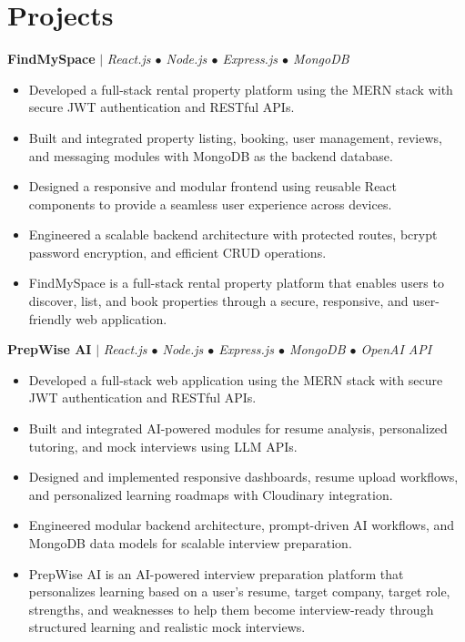 \documentclass[10pt,a4paper]{article}
\begin{document}
\section*{Projects}

\textbf{FindMySpace} \enspace $|$ \enspace
\textit{\small React.js \enspace $\bullet$ \enspace Node.js \enspace $\bullet$ \enspace Express.js \enspace $\bullet$ \enspace MongoDB}
\begin{itemize}[label=$\circ$]
    \item Developed a full-stack rental property platform using the MERN stack with secure JWT authentication and RESTful APIs.
    \item Built and integrated property listing, booking, user management, reviews, and messaging modules with MongoDB as the backend database.
    \item Designed a responsive and modular frontend using reusable React components to provide a seamless user experience across devices.
    \item Engineered a scalable backend architecture with protected routes, bcrypt password encryption, and efficient CRUD operations.
    \item FindMySpace is a full-stack rental property platform that enables users to discover, list, and book properties through a secure, responsive, and user-friendly web application.
\end{itemize}

\vspace{7pt}

\textbf{PrepWise AI} \enspace $|$ \enspace
\textit{\small React.js \enspace $\bullet$ \enspace Node.js \enspace $\bullet$ \enspace Express.js \enspace $\bullet$ \enspace MongoDB \enspace $\bullet$ \enspace OpenAI API}
\begin{itemize}[label=$\circ$]
    \item Developed a full-stack web application using the MERN stack with secure JWT authentication and RESTful APIs.
    \item Built and integrated AI-powered modules for resume analysis, personalized tutoring, and mock interviews using LLM APIs.
    \item Designed and implemented responsive dashboards, resume upload workflows, and personalized learning roadmaps with Cloudinary integration.
    \item Engineered modular backend architecture, prompt-driven AI workflows, and MongoDB data models for scalable interview preparation.
    \item PrepWise AI is an AI-powered interview preparation platform that personalizes learning based on a user's resume, target company, target role, strengths, and weaknesses to help them become interview-ready through structured learning and realistic mock interviews.
\end{itemize}
\end{document}
